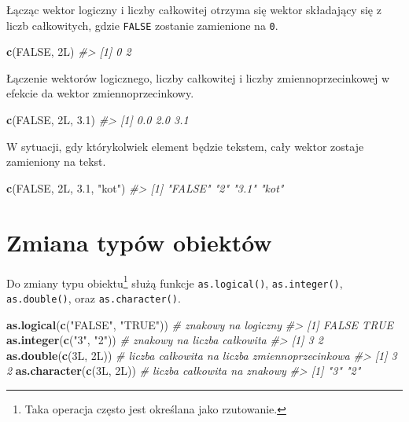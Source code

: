 \documentclass[paper=6in:9in,pagesize=pdftex,headinclude=on,footinclude=on,10pt]{scrbook}
\newenvironment{Shaded}{\begin{snugshade}}{\end{snugshade}}
\newcommand{\CommentTok}[1]{\textcolor[rgb]{0.56,0.35,0.01}{\textit{#1}}}
\newcommand{\FloatTok}[1]{\textcolor[rgb]{0.00,0.00,0.81}{#1}}
\newcommand{\KeywordTok}[1]{\textcolor[rgb]{0.13,0.29,0.53}{\textbf{#1}}}
\newcommand{\NormalTok}[1]{#1}
\newcommand{\OtherTok}[1]{\textcolor[rgb]{0.56,0.35,0.01}{#1}}
\newcommand{\StringTok}[1]{\textcolor[rgb]{0.31,0.60,0.02}{#1}}
\begin{document}
Łącząc wektor logiczny i liczby całkowitej otrzyma się wektor składający się z liczb całkowitych, gdzie \texttt{FALSE} zostanie zamienione na \texttt{0}.

\begin{Shaded}
\begin{Highlighting}[]
\KeywordTok{c}\NormalTok{(}\OtherTok{FALSE}\NormalTok{, 2L)}
\CommentTok{#> [1] 0 2}
\end{Highlighting}
\end{Shaded}

Łączenie wektorów logicznego, liczby całkowitej i liczby zmiennoprzecinkowej w efekcie da wektor zmiennoprzecinkowy.

\begin{Shaded}
\begin{Highlighting}[]
\KeywordTok{c}\NormalTok{(}\OtherTok{FALSE}\NormalTok{, 2L, }\FloatTok{3.1}\NormalTok{)}
\CommentTok{#> [1] 0.0 2.0 3.1}
\end{Highlighting}
\end{Shaded}

W sytuacji, gdy którykolwiek element będzie tekstem, cały wektor zostaje zamieniony na tekst.

\begin{Shaded}
\begin{Highlighting}[]
\KeywordTok{c}\NormalTok{(}\OtherTok{FALSE}\NormalTok{, 2L, }\FloatTok{3.1}\NormalTok{, }\StringTok{"kot"}\NormalTok{)}
\CommentTok{#> [1] "FALSE" "2"     "3.1"   "kot"}
\end{Highlighting}
\end{Shaded}

\hypertarget{zmiana-typuxf3w-obiektuxf3w}{%
\section{Zmiana typów obiektów}\label{zmiana-typuxf3w-obiektuxf3w}}

Do zmiany typu obiektu\footnote{Taka operacja często jest określana jako rzutowanie.} służą funkcje \texttt{as.logical()}, \texttt{as.integer()}, \texttt{as.double()}, oraz \texttt{as.character()}.

\begin{Shaded}
\begin{Highlighting}[]
\KeywordTok{as.logical}\NormalTok{(}\KeywordTok{c}\NormalTok{(}\StringTok{"FALSE"}\NormalTok{, }\StringTok{"TRUE"}\NormalTok{)) }\CommentTok{# znakowy na logiczny}
\CommentTok{#> [1] FALSE  TRUE}
\KeywordTok{as.integer}\NormalTok{(}\KeywordTok{c}\NormalTok{(}\StringTok{"3"}\NormalTok{, }\StringTok{"2"}\NormalTok{)) }\CommentTok{# znakowy na liczba całkowita }
\CommentTok{#> [1] 3 2}
\KeywordTok{as.double}\NormalTok{(}\KeywordTok{c}\NormalTok{(3L, 2L)) }\CommentTok{# liczba całkowita na liczba zmiennoprzecinkowa}
\CommentTok{#> [1] 3 2}
\KeywordTok{as.character}\NormalTok{(}\KeywordTok{c}\NormalTok{(3L, 2L)) }\CommentTok{# liczba całkowita na znakowy}
\CommentTok{#> [1] "3" "2"}
\end{Highlighting}
\end{Shaded}
\end{document}
